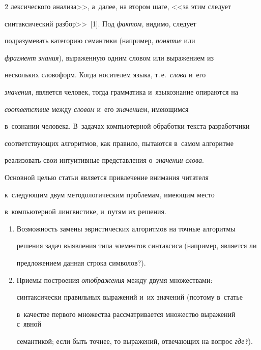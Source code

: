 \begin{multicols}{2}
лексического анализа>>, а~далее, на втором шаге, <<за этим следует 


синтаксический разбор>>~[1]. Под \textit{фактом}, видимо, следует 


подразумевать категорию семантики (например, \textit{понятие} или 


\textit{фрагмент знания}), выраженную одним словом или выражением из 


нескольких словоформ. Когда носителем языка, т.\,е.\ \textit{слова} и~его 


\textit{значения}, является человек, тогда грамматика и~языкознание опираются на 


\textit{соответствие} между \textit{словом} и~его \textit{значением}, имеющимся 


в~сознании человека. В~задачах компьютерной обработки текс\-та разработчики 


со\-от\-вет\-ст\-ву\-ющих алгоритмов, как правило, пытаются в~самом алгоритме 


реализовать свои интуитивные пред\-став\-ле\-ния о~\textit{значении слова}. 


     


     Основной целью статьи является при\-вле\-че\-ние внимания читателя 


к~сле\-ду\-ющим двум методологическим проб\-ле\-мам, име\-ющим место 


в~компьютерной лингвистике, и~путям их решения. 


     \begin{enumerate}[1.]


     \item Возможность замены эвристических алгоритмов на точ\-ные алгоритмы 


решения задач выявления типа элементов синтаксиса (например, является ли 


предложением данная строка символов?). 


     \item  Приемы построения \textit{отображения} между двумя множествами: 


синтаксически правильных выражений и~их значений (поэтому в~статье 


в~качестве первого множества рас\-смат\-ри\-ва\-ет\-ся множество выражений с~явной 


семантикой; если быть точ\-нее, то выражений, отвечающих на вопрос \textit{где?}).


     \end{enumerate}



\end{multicols}
